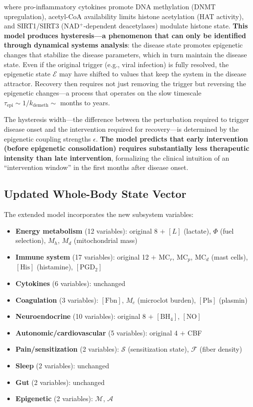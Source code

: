 where pro-inflammatory cytokines promote DNA methylation (DNMT upregulation), acetyl-CoA availability limits histone acetylation (HAT activity), and SIRT1/SIRT3 (NAD$^+$-dependent deacetylases) modulate histone state. \textbf{This model produces hysteresis---a phenomenon that can only be identified through dynamical systems analysis}: the disease state promotes epigenetic changes that stabilize the disease parameters, which in turn maintain the disease state. Even if the original trigger (e.g., viral infection) is fully resolved, the epigenetic state $\boldsymbol{\mathcal{E}}$ may have shifted to values that keep the system in the disease attractor. Recovery then requires not just removing the trigger but reversing the epigenetic changes---a process that operates on the slow timescale $\tau_{\text{epi}} \sim 1/k_{\text{demeth}} \sim$ months to years.

The hysteresis width---the difference between the perturbation required to trigger disease onset and the intervention required for recovery---is determined by the epigenetic coupling strengths $\epsilon$. \textbf{The model predicts that early intervention (before epigenetic consolidation) requires substantially less therapeutic intensity than late intervention}, formalizing the clinical intuition of an ``intervention window'' in the first months after disease onset.

\subsection{Updated Whole-Body State Vector}
\label{sec:updated-state-vector}

The extended model incorporates the new subsystem variables:

\begin{itemize}
    \item \textbf{Energy metabolism} (12 variables): original 8 $+$ $[L]$ (lactate), $\Phi$ (fuel selection), $M_h$, $M_d$ (mitochondrial mass)
    \item \textbf{Immune system} (17 variables): original 12 $+$ $\text{MC}_r$, $\text{MC}_p$, $\text{MC}_d$ (mast cells), $[\text{His}]$ (histamine), $[\text{PGD}_2]$
    \item \textbf{Cytokines} (6 variables): unchanged
    \item \textbf{Coagulation} (3 variables): $[\text{Fbn}]$, $M_c$ (microclot burden), $[\text{Pls}]$ (plasmin)
    \item \textbf{Neuroendocrine} (10 variables): original 8 $+$ $[\text{BH}_4]$, $[\text{NO}]$
    \item \textbf{Autonomic/cardiovascular} (5 variables): original 4 $+$ CBF
    \item \textbf{Pain/sensitization} (2 variables): $\mathcal{S}$ (sensitization state), $\mathcal{F}$ (fiber density)
    \item \textbf{Sleep} (2 variables): unchanged
    \item \textbf{Gut} (2 variables): unchanged
    \item \textbf{Epigenetic} (2 variables): $\mathcal{M}$, $\mathcal{A}$
\end{itemize}

